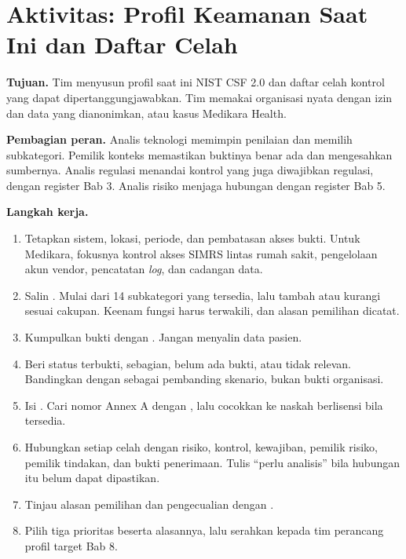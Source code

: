 \section{Aktivitas: Profil Keamanan Saat Ini dan Daftar Celah}

\textbf{Tujuan.} Tim menyusun profil saat ini NIST CSF 2.0 dan daftar celah kontrol yang dapat
dipertanggungjawabkan. Tim memakai organisasi nyata dengan izin dan data yang dianonimkan, atau kasus
Medikara Health.

\textbf{Pembagian peran.} Analis teknologi memimpin penilaian dan memilih subkategori. Pemilik konteks
memastikan buktinya benar ada dan mengesahkan sumbernya. Analis regulasi menandai kontrol yang juga
diwajibkan regulasi, dengan register Bab 3. Analis risiko menjaga hubungan dengan register Bab 5.

\textbf{Langkah kerja.}
\begin{enumerate}
  \item Tetapkan sistem, lokasi, periode, dan pembatasan akses bukti. Untuk Medikara, fokusnya kontrol
  akses SIMRS lintas rumah sakit, pengelolaan akun vendor, pencatatan \textit{log}, dan cadangan data.
  \item Salin . Mulai dari 14 subkategori yang
  tersedia, lalu tambah atau kurangi sesuai cakupan. Keenam fungsi harus terwakili, dan alasan
  pemilihan dicatat.
  \item Kumpulkan bukti dengan . Jangan menyalin data
  pasien.
  \item Beri status terbukti, sebagian, belum ada bukti, atau tidak relevan. Bandingkan dengan
   sebagai pembanding skenario, bukan bukti
  organisasi.
  \item Isi . Cari nomor Annex A dengan
  , lalu cocokkan ke naskah berlisensi bila
  tersedia.
  \item Hubungkan setiap celah dengan risiko, kontrol, kewajiban, pemilik risiko, pemilik tindakan,
  dan bukti penerimaan. Tulis ``perlu analisis'' bila hubungan itu belum dapat dipastikan.
  \item Tinjau alasan pemilihan dan pengecualian dengan .
  \item Pilih tiga prioritas beserta alasannya, lalu serahkan kepada tim perancang profil target
  Bab 8.
\end{enumerate}

